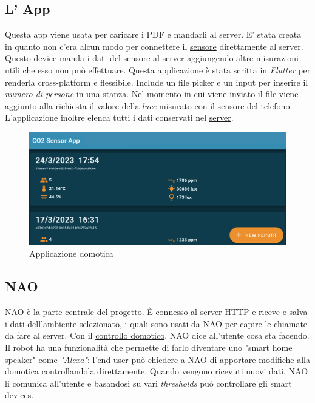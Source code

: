 \documentclass{optica-article}
\begin{document}
\bigskip
\subsection{L' App}\label{sec:domotics_app}
\vspace{5pt}
Questa app viene usata per caricare i PDF e mandarli al server. E' stata creata in quanto non c'era alcun modo per connettere il \hyperref[sec:domotics_sensor]{sensore} direttamente al server. Questo device manda i dati del sensore al server aggiungendo altre misurazioni utili che esso non può effettuare. Questa applicazione è stata scritta in \emph{Flutter} per renderla cross-platform e flessibile. Include un file picker e un input per inserire il \emph{numero di persone} in una stanza. Nel momento in cui viene inviato il file viene aggiunto alla richiesta il valore della \emph{luce} misurato con il sensore del telefono. L'applicazione inoltre elenca tutti i dati conservati nel \hyperref[sec:domotics_server]{server}.\\

\begin{figure}[H]
    \centering
    \includegraphics[scale=0.17]{figures/domotics_app.png}
    \caption{Applicazione domotica}
    \label{fig:app_domotica}
\end{figure}


\subsection{NAO}\label{sec:domotics_nao}
NAO è la parte centrale del progetto. È connesso al \hyperref[sec:domotics_server]{server HTTP} e riceve e salva i dati dell'ambiente selezionato, i quali sono usati da NAO per capire le chiamate da fare al server. Con il \hyperref[sec:domotics_domotics_server]{controllo domotico}, NAO dice all'utente cosa sta facendo. Il robot ha una funzionalità che permette di farlo diventare uno "smart home speaker" come \emph{"Alexa"}: l'end-user può chiedere a NAO di apportare modifiche alla domotica controllandola direttamente. Quando vengono ricevuti nuovi dati, NAO li comunica all'utente e basandosi su vari \emph{thresholds} può controllare gli smart devices.
\end{document}
